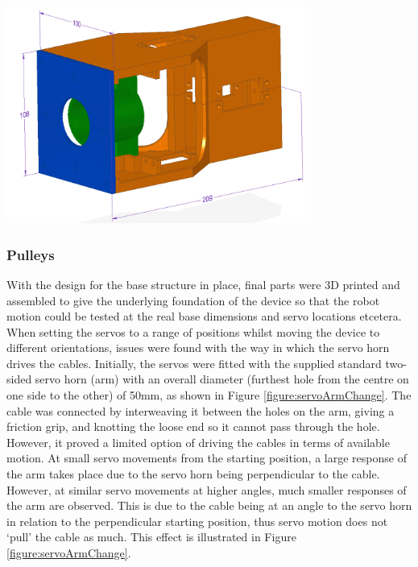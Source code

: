 \documentclass[11pt]{article}
\begin{document}
\begin{center}
\includegraphics[width=0.75\textwidth]{images/baseShape.png}
\label{figure:baseShape}
\end{center}



\subsubsection{Pulleys}
With the design for the base structure in place, final parts were 3D printed and assembled to give the underlying foundation of the device so that the robot motion could be tested at the real base dimensions and servo locations etcetera. When setting the servos to a range of positions whilst moving the device to different orientations, issues were found with the way in which the servo horn drives the cables. Initially, the servos were fitted with the supplied standard two-sided servo horn (arm) with an overall diameter (furthest hole from the centre on one side to the other) of 50mm, as shown in Figure \ref{figure:servoArmChange}. The cable was connected by interweaving it between the holes on the arm, giving a friction grip, and knotting the loose end so it cannot pass through the hole. However, it proved a limited option of driving the cables in terms of available motion. At small servo movements from the starting position, a large response of the arm takes place due to the servo horn being perpendicular to the cable. However, at similar servo movements at higher angles, much smaller responses of the arm are observed. This is due to the cable being at an angle to the servo horn in relation to the perpendicular starting position, thus servo motion does not `pull' the cable as much. This effect is illustrated in Figure \ref{figure:servoArmChange}.
\end{document}
